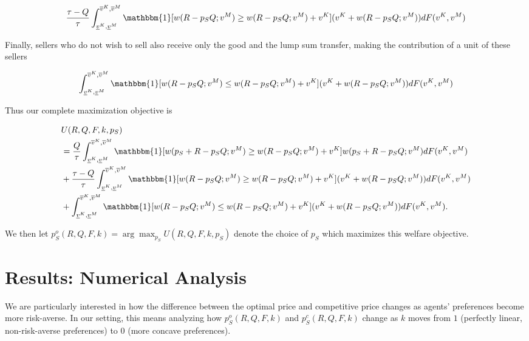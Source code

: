 \documentclass[AER]{AEA}
\begin{document}
\begin{equation}
    \frac{\tau - Q}{\tau} \int_{\underline{v}^K, \underline{v}^M}^{\overline{v}^K, \overline{v}^M} \mathbbm{1}[w(R - p_SQ; v^M) \ge w(R - p_S Q ; v^M) + v^K] (v^K + w(R - p_SQ; v^M)) dF(v^K, v^M)
\end{equation}

Finally, sellers who do not wish to sell also receive only the good and the lump sum transfer, making the contribution of a unit of these sellers

\begin{equation}
    \int_{\underline{v}^K, \underline{v}^M}^{\overline{v}^K, \overline{v}^M} \mathbbm{1}[w(R - p_SQ; v^M) \le w(R - p_S Q ; v^M) + v^K] (v^K + w(R - p_SQ; v^M)) dF(v^K, v^M)
\end{equation}

Thus our complete maximization objective is

\begin{equation}
    \begin{split}
        & U(R, Q, F, k, p_S) \\
        & = \frac{Q}{\tau} \int_{\underline{v}^K, \underline{v}^M}^{\overline{v}^K, \overline{v}^M} \mathbbm{1}[w(p_S + R - p_SQ; v^M) \ge w(R - p_S Q ; v^M) + v^K] w(p_S + R - p_SQ; v^M) dF(v^K, v^M) \\
        & + \frac{\tau - Q}{\tau} \int_{\underline{v}^K, \underline{v}^M}^{\overline{v}^K, \overline{v}^M} \mathbbm{1}[w(R - p_SQ; v^M) \ge w(R - p_S Q ; v^M) + v^K] (v^K + w(R - p_SQ; v^M)) dF(v^K, v^M) \\
        & + \int_{\underline{v}^K, \underline{v}^M}^{\overline{v}^K, \overline{v}^M} \mathbbm{1}[w(R - p_SQ; v^M) \le w(R - p_S Q ; v^M) + v^K] (v^K + w(R - p_SQ; v^M)) dF(v^K, v^M).
    \end{split}
\end{equation}

We then let $p_S^o(R, Q, F, k) = \arg \max_{p_S} U(R, Q, F, k, p_S)$ denote the choice of $p_S$ which maximizes this welfare objective.

\section{Results: Numerical Analysis}
\label{sec:results-numerical-analysis}

We are particularly interested in how the difference between the optimal price and competitive price changes as agents' preferences become more risk-averse. In our setting, this means analyzing how $p_S^o(R, Q, F, k)$ and $p_S^c(R, Q, F, k)$ change as $k$ moves from $1$ (perfectly linear, non-risk-averse preferences) to $0$ (more concave preferences).
\end{document}
